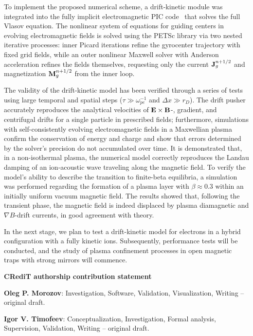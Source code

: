 \documentclass[final,3p]{elsarticle}
\begin{document}
To implement the proposed numerical scheme, a drift-kinetic module was integrated into the fully implicit electromagnetic PIC code~\cite{Kurshakov2026,xpic} that solves the full Vlasov equation. The nonlinear system of equations for guiding centers in evolving electromagnetic fields is solved using the PETSc library via two nested iterative processes: inner Picard iterations refine the gyrocenter trajectory with fixed grid fields, while an outer nonlinear Maxwell solver with Anderson acceleration refines the fields themselves, requesting only the current ${\bf J}_g^{n+1/2}$ and magnetization ${\bf M}_g^{n+1/2}$ from the inner loop.

The validity of the drift-kinetic model has been verified through a series of tests using large temporal and spatial steps ($\tau \gg \omega_{pe}^{-1}$ and $\Delta x \gg r_D$). The drift pusher accurately reproduces the analytical velocities of ${\bf E}\times{\bf B}$-, gradient, and centrifugal drifts for  a single particle in prescribed fields; furthermore, simulations with self-consistently evolving electromagnetic fields in a Maxwellian plasma confirm the conservation of energy and charge and show that errors determined by the solver's precision do not accumulated over time. It is demonstrated that, in a non-isothermal plasma, the numerical model correctly reproduces the Landau damping of an ion-acoustic wave traveling along the magnetic field. To verify the model's ability to describe the transition to finite-beta equilibria, a simulation was performed regarding the formation of a plasma layer with $\beta \approx 0.3$ within an initially uniform vacuum magnetic field. The results showed that, following the transient phase, the magnetic field is indeed displaced by plasma diamagnetic and $\nabla B$-drift currents, in good agreement with theory.

In the next stage, we plan to test a drift-kinetic model for electrons in a hybrid configuration with a fully kinetic ions. Subsequently, performance tests will be conducted, and the study of plasma confinement processes in open magnetic traps with strong mirrors will commence.




{\bf CRediT authorship contribution statement}

{\bf Oleg P. Morozov}: Investigation, Software, Validation, Visualization, Writing – original draft.

{\bf Igor V. Timofeev}: Conceptualization, Investigation, Formal analysis, Supervision, Validation, Writing – original draft.
\end{document}
